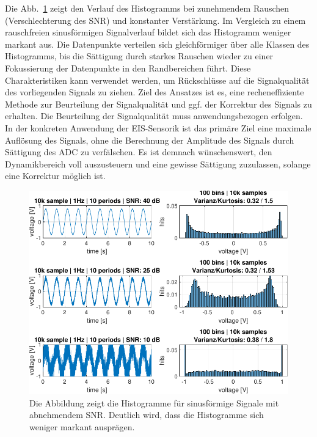 Die Abb.~\ref{fig:Histogramm-SNR} zeigt den Verlauf des Histogramms bei zunehmendem Rauschen (Verschlechterung des SNR) und konstanter Verstärkung. Im Vergleich zu einem rauschfreien sinusförmigen Signalverlauf bildet sich das Histogramm weniger markant aus. Die Datenpunkte verteilen sich gleichförmiger über alle Klassen des Histogramms, bis die Sättigung durch starkes Rauschen wieder zu einer Fokussierung der Datenpunkte in den Randbereichen führt. Diese Charakteristiken kann verwendet werden, um Rückschlüsse auf die Signalqualität des vorliegenden Signals zu ziehen. Ziel des Ansatzes ist es, eine recheneffiziente Methode zur Beurteilung der Signalqualität und ggf. der Korrektur des Signals zu erhalten. Die Beurteilung der Signalqualität muss anwendungsbezogen erfolgen. In der konkreten Anwendung der EIS-Sensorik ist das primäre Ziel eine maximale Auflösung des Signals, ohne die Berechnung der Amplitude des Signals durch Sättigung des ADC zu verfälschen. Es ist demnach wünschenswert, den Dynamikbereich voll auszusteuern und eine gewisse Sättigung zuzulassen, solange eine Korrektur möglich ist.

\begin{figure}[h!] 
	\centering 
	\includegraphics[width=1\columnwidth]{../img/noise-histogramm.pdf}
	\caption{Die Abbildung zeigt die Histogramme für sinusförmige Signale mit abnehmendem SNR. Deutlich wird, dass die Histogramme sich weniger markant ausprägen.}
	\label{fig:Histogramm-SNR}
\end{figure} 

